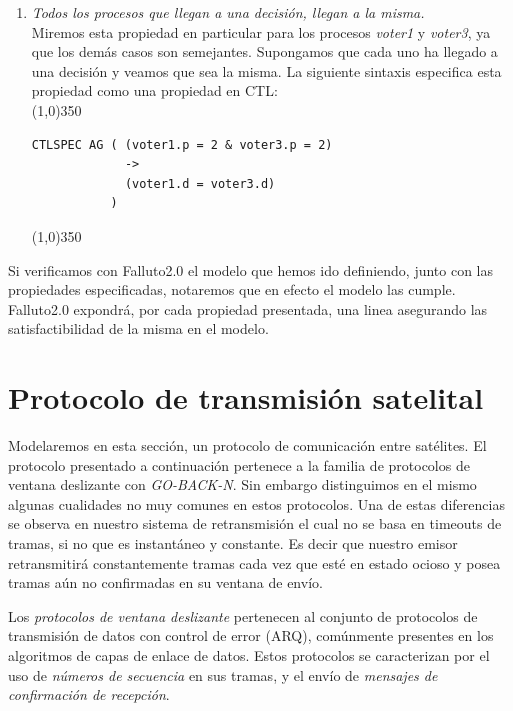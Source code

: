 \documentclass[titlepage, 12pt]{book}
\begin{document}
\begin{enumerate}
\item \textit{Todos los procesos que llegan a una decisi\'on, llegan a la misma.}\\ Miremos esta propiedad en particular para los procesos \textit{voter1} y \textit{voter3}, ya que los dem\'as casos son semejantes. Supongamos que cada uno ha llegado a una decisi\'on y veamos que sea la misma. La siguiente sintaxis especifica esta propiedad como una propiedad en CTL:\\
\noindent \line(1,0){350}
\begin{verbatim}
CTLSPEC AG ( (voter1.p = 2 & voter3.p = 2) 
             -> 
             (voter1.d = voter3.d)
           )
\end{verbatim}
\noindent \line(1,0){350}

\end{enumerate}

Si verificamos con Falluto2.0 el modelo que hemos ido definiendo, junto con las propiedades especificadas, notaremos que en efecto el modelo las cumple. Falluto2.0 expondr\'a, por cada propiedad presentada, una linea asegurando las satisfactibilidad de la misma en el modelo.






\section{Protocolo de transmisi\'on satelital}

Modelaremos en esta secci\'on, un protocolo de comunicaci\'on entre sat\'elites. El protocolo presentado a continuaci\'on pertenece a la familia de protocolos de ventana deslizante con \textit{GO-BACK-N}. Sin embargo distinguimos en el mismo algunas cualidades no muy comunes en estos protocolos. Una de estas diferencias se observa en nuestro sistema de retransmisi\'on el cual no se basa en timeouts de tramas, si no que es instant\'aneo y constante. Es decir que nuestro emisor retransmitir\'a constantemente tramas cada vez que est\'e en estado ocioso y posea tramas a\'un no confirmadas en su ventana de env\'io.

Los \textit{protocolos de ventana deslizante} pertenecen al conjunto de protocolos de transmisi\'on de datos con control de error (ARQ), com\'unmente presentes en los algoritmos de capas de enlace de datos. Estos protocolos se caracterizan por el uso de \textit{n\'umeros de secuencia} en sus tramas, y el env\'io de \textit{mensajes de confirmaci\'on de recepci\'on}.
\end{document}
